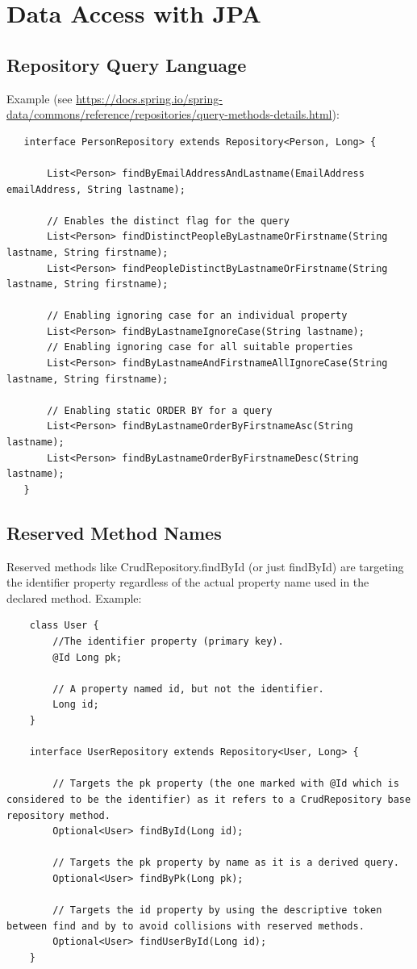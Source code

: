 \documentclass{scrartcl}
\begin{document}
\section{Data Access with JPA}
\subsection{Repository Query Language}

Example (see \url{  https://docs.spring.io/spring-data/commons/reference/repositories/query-methods-details.html}):


\begin{lstlisting}
   interface PersonRepository extends Repository<Person, Long> {

       List<Person> findByEmailAddressAndLastname(EmailAddress emailAddress, String lastname);

       // Enables the distinct flag for the query
       List<Person> findDistinctPeopleByLastnameOrFirstname(String lastname, String firstname);
       List<Person> findPeopleDistinctByLastnameOrFirstname(String lastname, String firstname);

       // Enabling ignoring case for an individual property
       List<Person> findByLastnameIgnoreCase(String lastname);
       // Enabling ignoring case for all suitable properties
       List<Person> findByLastnameAndFirstnameAllIgnoreCase(String lastname, String firstname);

       // Enabling static ORDER BY for a query
       List<Person> findByLastnameOrderByFirstnameAsc(String lastname);
       List<Person> findByLastnameOrderByFirstnameDesc(String lastname);
   }
\end{lstlisting}

\subsection{Reserved Method Names}

    Reserved methods like CrudRepository.findById (or just findById) are targeting the identifier property regardless of the actual property name used in the declared method.
    Example:

\begin{lstlisting}
    class User {
        //The identifier property (primary key).
        @Id Long pk;

        // A property named id, but not the identifier.
        Long id;
    }

    interface UserRepository extends Repository<User, Long> {

        // Targets the pk property (the one marked with @Id which is considered to be the identifier) as it refers to a CrudRepository base repository method.
        Optional<User> findById(Long id);

        // Targets the pk property by name as it is a derived query.
        Optional<User> findByPk(Long pk);

        // Targets the id property by using the descriptive token between find and by to avoid collisions with reserved methods.
        Optional<User> findUserById(Long id);
    }

\end{lstlisting}
\end{document}
